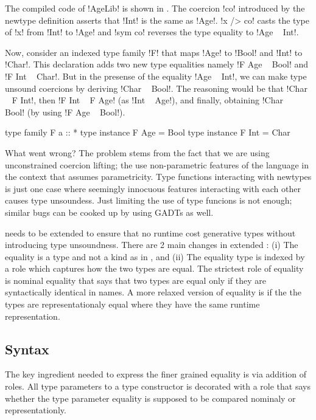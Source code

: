 \documentclass[manuscript,screen,nonacm]{acmart}
\begin{document}
The compiled code of !AgeLib! is shown in . The coercion !co! introduced by the newtype definition asserts that !Int! is the same as !Age!. !x /> co! casts the type of !x! from !Int! to !Age! and !sym co! reverses the type equality to !Age ~ Int!.

Now, consider an indexed type family !F! that maps !Age! to !Bool! and !Int! to !Char!. This declaration adds two new type equalities namely !F Age ~ Bool! and !F Int ~ Char!. But in the presense of the equality !Age ~ Int!, we can make type unsound coercions by deriving !Char ~ Bool!. The reasoning would be that !Char ~ F Int!, then !F Int ~ F Age! (as !Int ~ Age!), and finally, obtaining !Char ~ Bool! (by using !F Age ~ Bool!).

\begin{code}
  type family F a :: *
  type instance F Age = Bool
  type instance F Int = Char
\end{code}

What went wrong? The problem stems from the fact that we are using unconstrained coercion lifting; the use non-parametric features of the language in the context that assumes parametricity. Type functions interacting with newtypes is just one case where seemingly innocuous features interacting with each other causes type unsoundess. Just limiting the use of type funcions is not enough; similar bugs can be cooked up by using GADTs as well.

\SFC needs to be extended to ensure that no runtime cost generative types without introducing type unsoundness.
There are 2 main changes in extended \SFR: (i) The equality is a type and not a kind as in \SFC, and (ii) The equality type is indexed by a role which captures how the two types are equal. The strictest role of equality is nominal equality that says that two types are equal only if they are syntactically identical in names. A more relaxed version of equality is if the the types are representationaly equal where they have the same runtime representation.
\subsection{Syntax}
The key ingredient needed to express the finer grained equality is via addition of roles. All type parameters to a type constructor is decorated with a role that says whether the type parameter equality is supposed to be compared nominaly or representationly.
\end{document}
